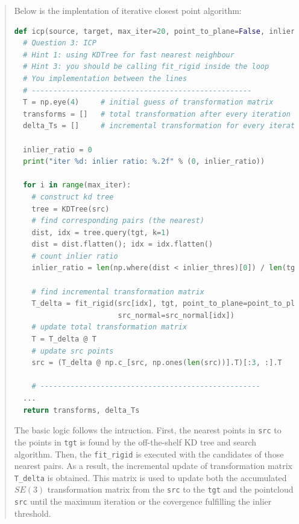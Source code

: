\documentclass[11pt]{article}
\begin{document}
\begin{quote}

Below is the implentation of iterative closest point algorithm:

\begin{lstlisting}[language=Python, basicstyle=\scriptsize]
def icp(source, target, max_iter=20, point_to_plane=False, inlier_thres=0.1):
  # Question 3: ICP
  # Hint 1: using KDTree for fast nearest neighbour
  # Hint 3: you should be calling fit_rigid inside the loop
  # You implementation between the lines
  # ---------------------------------------------------
  T = np.eye(4)     # initial guess of transformation matrix 
  transforms = []   # total transformation after every iteration
  delta_Ts = []     # incremental transformation for every iteration

  inlier_ratio = 0
  print("iter %d: inlier ratio: %.2f" % (0, inlier_ratio))

  for i in range(max_iter):
    # construct kd tree
    tree = KDTree(src)
    # find corresponding pairs (the nearest)
    dist, idx = tree.query(tgt, k=1)
    dist = dist.flatten(); idx = idx.flatten()
    # count inlier ratio
    inlier_ratio = len(np.where(dist < inlier_thres)[0]) / len(tgt)

    # find incremental transformation matrix
    T_delta = fit_rigid(src[idx], tgt, point_to_plane=point_to_plane, \
                        src_normal=src_normal[idx])
    # update total transformation matrix
    T = T_delta @ T
    # update src points
    src = (T_delta @ np.c_[src, np.ones(len(src))].T)[:3, :].T

    # ---------------------------------------------------
  ...
  return transforms, delta_Ts
\end{lstlisting}

The basic logic follows the intruction. First, the nearest points in \texttt{src} to the points in \texttt{tgt} is found by the off-the-shelf KD tree and search algorithm. Then, the \texttt{fit\_rigid} is executed with the candidates of those nearest pairs. As a result, the incremental update of transformation matrix \texttt{T\_delta} is obtained. This matrix is used to update both the accumulated $SE(3)$ transformation matrix from the \texttt{src} to the \texttt{tgt} and the pointcloud \texttt{src} until the maximum iteration or the covergence fulfilling the inlier threshold. 


\end{quote}
\end{document}
